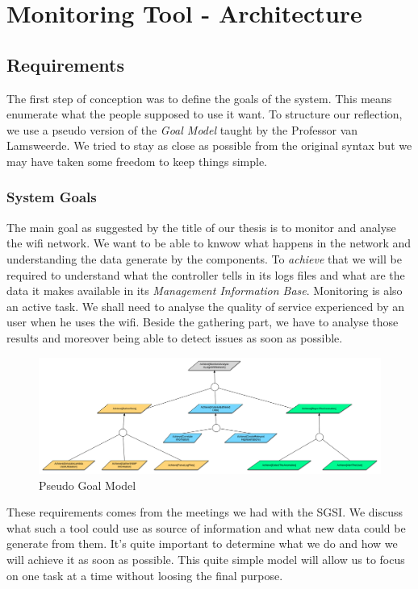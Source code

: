 
\chapter{Monitoring Tool - Architecture} %

\label{Chapter3} %

\section{Requirements}
The first step of conception was to define the goals of the system. This means enumerate what the people supposed to use it want. To structure our reflection, we use a pseudo version of the \emph{Goal Model} taught by the Professor van Lamsweerde\cite{van2009requirements}. We tried to stay as close as possible from the original syntax but we may have taken some freedom to keep things simple.
\subsection{System Goals}
The main goal as suggested by the title of our thesis is to monitor and analyse the wifi network. We want to be able to knwow what happens in the network and understanding the data generate by the components. To \emph{achieve} that we will be required to understand what the controller tells in its logs files and what are the data it makes available in its \emph{Management Information Base}. Monitoring is also an active task. We shall need to analyse the quality of service experienced by an user when he uses the wifi. Beside the gathering part, we have to analyse those results and moreover being able to detect issues as soon as possible.
\begin{figure}[H]
\centering
	\includegraphics[width=1.1\linewidth]{Pictures/chapter3/goals.jpg}
	\caption{Pseudo Goal Model}
\end{figure}
These requirements comes from the meetings we had with the SGSI. We discuss what such a tool could use as source of information and what new data could be generate from them. It's quite important to determine what we do and how we will achieve it as soon as possible. This quite simple model will allow us to focus on one task at a time without loosing the final purpose.

